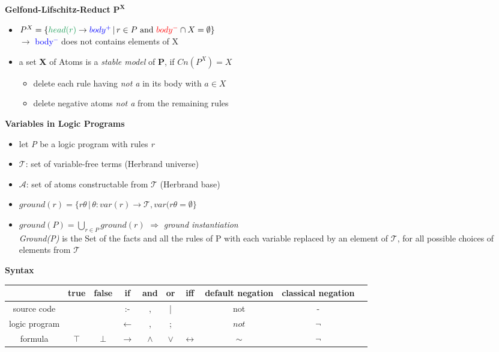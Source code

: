 \documentclass[12pt,a4paper]{article}
\newcommand{\red}[1]{\textcolor{red} {#1}}
\newcommand{\blue}[1]{\textcolor{blue} {#1}}
\newcommand{\green}[1]{\textcolor{ForestGreen} {#1}}
\begin{document}
\textbf{Gelfond-Lifschitz-Reduct} $\mathbf{P^X}$
\begin{itemize}
\item $P^X = \{\green{head(r)} \rightarrow \blue{body^+} \,|\, r\in P \text{ and } \red{body^-} \cap X = \emptyset\}$\\
$\rightarrow$ \blue{body$^-$} does not contains elements of X
\item a set \textbf{X} of Atoms is a \textit{stable model} of \textbf{P}, if $Cn(P^X) = X$
\begin{itemize}
\item delete each rule having \textit{not a} in its body with $a\in X$
\item delete negative atoms \textit{not a} from the remaining rules
\end{itemize}
\end{itemize}

\textbf{Variables in Logic Programs}
\begin{itemize}
\item let \textit{P} be a logic program with rules \textit{r}
\item $\mathcal{T}$: set of variable-free terms (Herbrand universe)
\item $\mathcal{A}$: set of atoms constructable from $\mathcal{T}$ (Herbrand base)
\item $ground(r) = \{r\theta \,|\, \theta: var(r) \rightarrow \mathcal{T}, var(r\theta = \emptyset \}$
\item $\displaystyle ground(P) = \bigcup_{r\in P} ground(r)$ $\Rightarrow$  \textit{ground instantiation}\\
\textit{Ground(P)} is the Set of the facts and all the rules of P with each variable replaced by an element of $\mathcal{T}$, for all possible choices of elements from $\mathcal{T}$
\end{itemize}


\textbf{Syntax}\\
\begin{tabular}{c c c c c c c c c c}
 & true & false & if & and & or & iff & default negation & classical negation \\
 \hline
source code & & & :- & , & | & & not & -\\
logic program &  & & $\leftarrow$ & , & ; & & $not$ & $\lnot$\\
formula & $\top$ & $\bot$ & $\rightarrow$ & $\land$ & $\lor$ & $\leftrightarrow$ & $\sim$ & $\lnot$\\
\hline
\end{tabular}
\end{document}
